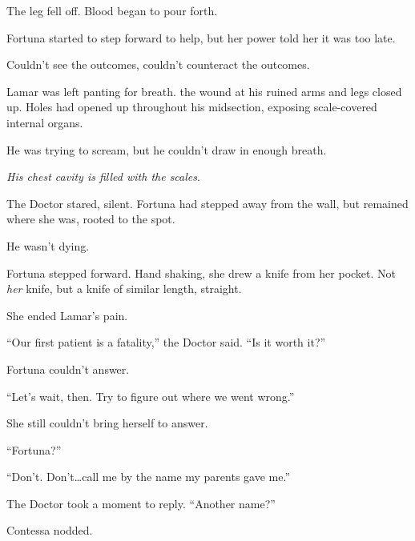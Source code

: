 The leg fell off.  Blood began to pour forth.



Fortuna started to step forward to help, but her power told her it was too late.



Couldn't see the outcomes, couldn't counteract the outcomes.



Lamar was left panting for breath.  the wound at his ruined arms and legs closed up.  Holes had opened up throughout his midsection, exposing scale-covered internal organs.



He was trying to scream, but he couldn't draw in enough breath.



\emph{His chest cavity is filled with the scales}.



The Doctor stared, silent.  Fortuna had stepped away from the wall, but remained where she was, rooted to the spot.



He wasn't dying.



Fortuna stepped forward.  Hand shaking, she drew a knife from her pocket.  Not \emph{her} knife, but a knife of similar length, straight.



She ended Lamar's pain.



``Our first patient is a fatality,'' the Doctor said.  ``Is it worth it?''



Fortuna couldn't answer.



``Let's wait, then.  Try to figure out where we went wrong.''



She still couldn't bring herself to answer.



``Fortuna?''



``Don't.  Don't\ldots call me by the name my parents gave me.''



The Doctor took a moment to reply.  ``Another name?''



Contessa nodded.



